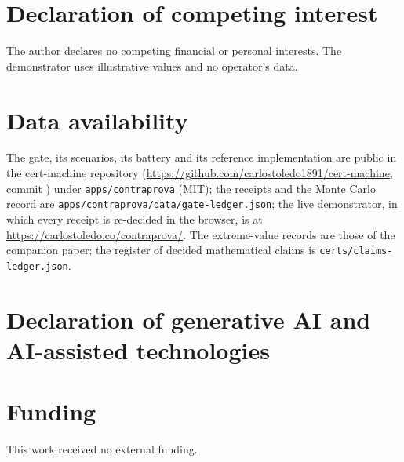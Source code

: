 \documentclass[preprint,11pt,authoryear]{elsarticle}
\begin{document}
\section*{Declaration of competing interest}
The author declares no competing financial or personal interests. The demonstrator uses illustrative values and no operator's data.

\section*{Data availability}
The gate, its scenarios, its battery and its reference implementation are public in the cert-machine repository (\url{https://github.com/carlostoledo1891/cert-machine}, commit \RepoCommit) under \texttt{apps/contraprova} (MIT); the receipts and the Monte Carlo record are \texttt{apps/contraprova/data/gate-ledger.json}; the live demonstrator, in which every receipt is re-decided in the browser, is at \url{https://carlostoledo.co/contraprova/}. The extreme-value records are those of the companion paper; the register of decided mathematical claims is \texttt{certs/claims-ledger.json}.

\section*{Declaration of generative AI and AI-assisted technologies}
\cmaideclaration

\section*{Funding}
This work received no external funding.
\end{document}
